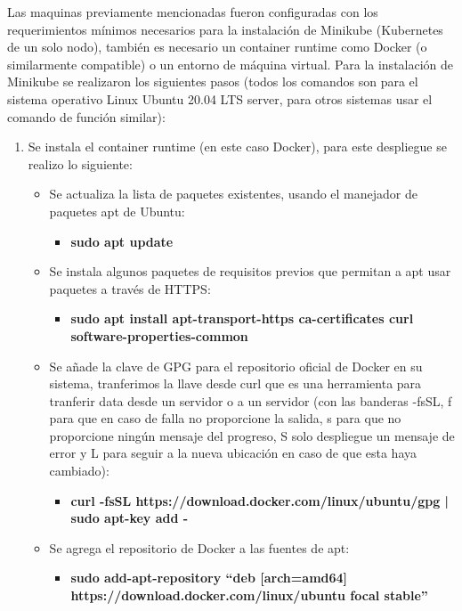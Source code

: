 \par Las maquinas previamente mencionadas fueron configuradas con los requerimientos mínimos necesarios para la instalación de Minikube (Kubernetes de un solo nodo), también es necesario un container runtime como Docker (o similarmente compatible) o un entorno de máquina virtual. Para la instalación de Minikube se realizaron los siguientes pasos (todos los comandos son para el sistema operativo Linux Ubuntu 20.04 LTS server, para otros sistemas usar el comando de función similar):
\begin{enumerate}
    \item Se instala el container runtime (en este caso Docker), para este despliegue se realizo lo siguiente:
    \begin{itemize}
        \item Se actualiza la lista de paquetes existentes, usando el manejador de paquetes apt de Ubuntu:\begin{itemize}
            \item \textbf{sudo apt update}
        \end{itemize}
        \item Se instala algunos paquetes de requisitos previos que permitan a apt usar paquetes a través de HTTPS:
        \begin{itemize}
            \item \textbf{sudo apt install apt-transport-https ca-certificates curl software-properties-common}
        \end{itemize}
        \item Se añade la clave de GPG para el repositorio oficial de Docker en su sistema, tranferimos la llave desde curl que es una herramienta para tranferir data desde un servidor o a un servidor (con las banderas -fsSL, f para que en caso de falla no proporcione la salida, s para que no proporcione ningún mensaje del progreso, S solo despliegue un mensaje de error y L para seguir a la nueva ubicación en caso de que esta haya cambiado):
        \begin{itemize}
            \item \textbf{curl -fsSL https://download.docker.com/linux/ubuntu/gpg | sudo apt-key add -}
        \end{itemize}
        \item Se agrega el repositorio de Docker a las fuentes de apt:
        \begin{itemize}
            \item \textbf{sudo add-apt-repository ``deb [arch=amd64]\\ https://download.docker.com/linux/ubuntu focal stable''}

\end{itemize}
\end{itemize}
\end{enumerate}
